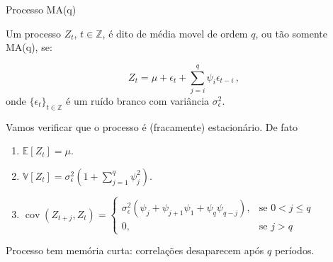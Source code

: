 \documentclass[11pt]{beamer}
\newenvironment{halfwideitemize}{\itemize\addtolength{\itemsep}{0.5em}}{\enditemize}
\begin{document}
\begin{frame}{Processo  MA(q)}
	\begin{halfwideitemize}
			\item Um processo $Z_t$, $t \in \mathbb{Z}$, é dito de média movel de ordem $q$, ou tão somente MA(q), se:
			
			$$Z_t = \mu + \epsilon_t + \sum_{j=i}^{q} \psi_i \epsilon_{t-i} \, ,$$
			onde $\{\epsilon_t\}_{t \in \mathbb{Z}}$ é um ruído branco com variância $\sigma^2_\epsilon$.
			\item Vamos verificar que o processo é (fracamente) estacionário. De fato
			\begin{enumerate}
				\item 			$\mathbb{E}[Z_t] = \mu $.
				\item $\mathbb{V}[Z_t] = \sigma^2_\epsilon(1+ \sum_{j=1}^q\psi^2_j)$.
				\item $\operatorname{cov}( Z_{t+j}, Z_t) = \begin{cases}
					\sigma^2_\epsilon (\psi_{j} + \psi_{j+1}\psi_1 + \psi_q \psi_{q-j}), & \text{se } 0 < j  \leq q \\
					0,& \text{se } j  > q
				\end{cases}$
			\end{enumerate}
			\item Processo tem memória curta: correlações desaparecem após $q$ períodos.
	\end{halfwideitemize}
\end{frame}
\end{document}
